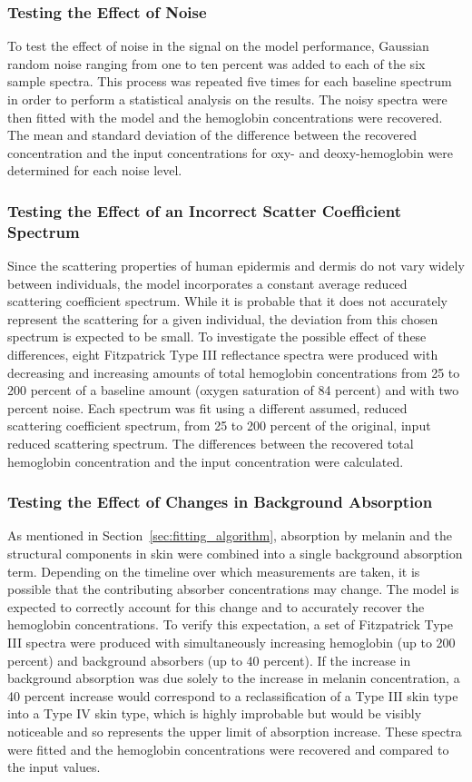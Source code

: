 \subsubsection{Testing the Effect of Noise}
To test the effect of noise in the signal on the model performance, Gaussian random noise ranging from one to ten percent was added to each of the six sample spectra. This process was repeated five times for each baseline spectrum in order to perform a statistical analysis on the results. The noisy spectra were then fitted with the model and the hemoglobin concentrations were recovered. The mean and standard deviation of the difference between the recovered concentration and the input concentrations for oxy- and deoxy-hemoglobin were determined for each noise level.

\subsubsection{Testing the Effect of an Incorrect Scatter Coefficient Spectrum}
Since the scattering properties of human epidermis and dermis do not vary widely between individuals, the model incorporates a constant average reduced scattering coefficient spectrum. While it is probable that it does not accurately represent the scattering for a given individual, the deviation from this chosen spectrum is expected to be small. To investigate the possible effect of these differences, eight Fitzpatrick Type III reflectance spectra were produced with decreasing and increasing amounts of total hemoglobin concentrations from 25 to 200 percent of a baseline amount (oxygen saturation of 84 percent)\cite{Arimoto2006} and with two percent noise. Each spectrum was fit using a different assumed, reduced scattering coefficient spectrum, from 25 to 200 percent of the original, input reduced scattering spectrum. The differences between the recovered total hemoglobin concentration and the input concentration were calculated.

\subsubsection{Testing the Effect of Changes in Background Absorption}
As mentioned in Section~\ref{sec:fitting_algorithm}, absorption by melanin and the structural components in skin were combined into a single background absorption term. Depending on the timeline over which measurements are taken, it is possible that the contributing absorber concentrations may change. The model is expected to correctly account for this change and to accurately recover the hemoglobin concentrations. To verify this expectation, a set of Fitzpatrick Type III spectra were produced with simultaneously increasing hemoglobin (up to 200 percent) and background absorbers (up to 40 percent). If the increase in background absorption was due solely to the increase in melanin concentration, a 40 percent increase would correspond to a reclassification of a Type III skin type into a Type IV skin type, which is highly improbable but would be visibly noticeable and so represents the upper limit of absorption increase. These spectra were fitted and the hemoglobin concentrations were recovered and compared to the input values.

